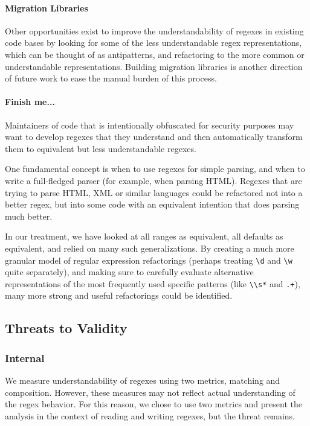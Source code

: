 \paragraph{Migration Libraries} 
Other opportunities exist to improve the understandability of regexes in existing code bases
by looking for some of the less understandable regex representations, which can be thought of as antipatterns, and refactoring to the more common or understandable representations. Building migration libraries is another direction of future work to ease the manual burden of this process. 

\paragraph{Finish me...}
Maintainers of code that is intentionally obfuscated for security purposes may want to develop regexes that they understand and then automatically transform them to equivalent but less understandable regexes.

One fundamental concept is when to use regexes for simple parsing, and when to write a full-fledged parser (for example, when parsing HTML).  Regexes that are trying to parse HTML, XML or similar languages could be refactored not into a better regex, but into some code with an equivalent intention that does parsing much better.

In our treatment, we have looked at all ranges as equivalent, all defaults as equivalent, and relied on many such generalizations.  By creating a much more granular model of regular expression refactorings (perhaps treating \verb!\d! and \verb!\w! quite separately), and making sure to carefully evaluate alternative representations of the most frequently used specific patterns (like \verb!\\s*! and \verb!.+!), many more strong and useful refactorings could be identified.



\subsection{Threats to Validity}

\subsubsection{Internal}
We measure understandability of regexes using two metrics, matching and composition. However, these measures may not reflect actual understanding of the regex behavior. For this reason, we chose to use two metrics and present the analysis in the context of reading and writing regexes, but the threat remains.

